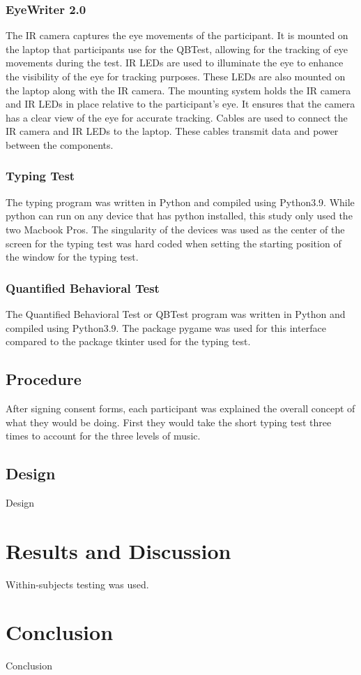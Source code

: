 \documentclass[manuscript, screen, review]{acmart} %
\begin{document}
\subsubsection{EyeWriter 2.0}
The IR camera captures the eye movements of the participant.
It is mounted on the laptop that participants use for the QBTest, allowing for the tracking of eye movements during the test.
IR LEDs are used to illuminate the eye to enhance the visibility of the eye for tracking purposes. 
These LEDs are also mounted on the laptop along with the IR camera. 
The mounting system holds the IR camera and IR LEDs in place relative to the participant's eye. 
It ensures that the camera has a clear view of the eye for accurate tracking. 
Cables are used to connect the IR camera and IR LEDs to the laptop. These cables transmit data and power between the components.
\subsubsection{Typing Test}
The typing program was written in Python and compiled using Python3.9. While python can run on any device that has python installed, this study only used the two Macbook Pros. The singularity of the devices was used as the center of the screen for the typing test was hard coded when setting the starting position of the window for the typing test. 

\subsubsection{Quantified Behavioral Test}
The Quantified Behavioral Test or QBTest program was written in Python and compiled using Python3.9. The package pygame was used for this interface compared to the package tkinter used for the typing test.

\subsection[short]{Procedure}
After signing consent forms, each participant was explained the overall concept of what they would be doing. First they would take the short typing test three times to account for the three levels of music. 

\subsection[short]{Design}
Design

\section{Results and Discussion}
Within-subjects testing was used.

\section{Conclusion}
Conclusion



\end{document}
